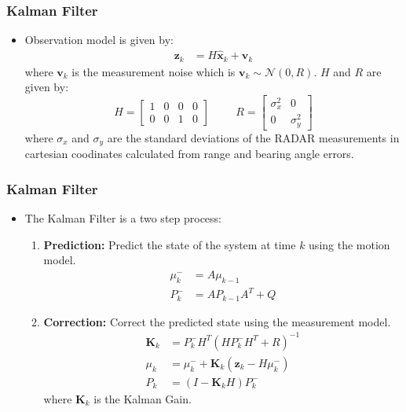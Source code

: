 \documentclass{beamer}
\begin{document}
\begin{frame}
\frametitle{Kalman Filter}
\begin{itemize}
    \item Observation model is given by:
    \begin{align*}
        \mathbf{z}_k &= H \hat{\mathbf{x}}_k + \mathbf{v}_k
    \end{align*}
    where $\mathbf{v}_k$ is the measurement noise which is $\mathbf{v}_k \sim \mathcal{N}(0, R)$. $H$ and $R$ are given by:
    \begin{equation*}
        H = \begin{bmatrix}
            1 & 0 & 0 & 0 \\
            0 & 0 & 1 & 0
        \end{bmatrix} \hspace{1cm} 
        R = \begin{bmatrix}
            \sigma^2_x & 0 \\
            0 & \sigma^2_y
        \end{bmatrix}
    \end{equation*}
    where $\sigma_x$ and $\sigma_y$ are the standard deviations of the RADAR measurements in cartesian coodinates calculated from 
    range and bearing angle errors.
\end{itemize}
\end{frame}

\begin{frame}
\frametitle{Kalman Filter}
\begin{itemize}
    \item The Kalman Filter is a two step process:
    \begin{enumerate}
        \item \textbf{Prediction:} Predict the state of the system at time $k$ using the motion model.
        \begin{align*}
            \mu_k^- &= A \mu_{k-1} \\
            P_k^- &= A P_{k-1} A^T + Q
        \end{align*}
        \item \textbf{Correction:} Correct the predicted state using the measurement model.
        \begin{align*}
            \mathbf{K}_k &= P_k^- H^T (H P_k^- H^T + R)^{-1} \\
            \mu_k &= \mu_k^- + \mathbf{K}_k (\mathbf{z}_k - H \mu_k^-) \\
            P_k &= (I - \mathbf{K}_k H) P_k^-
        \end{align*}
        where $\mathbf{K}_k$ is the Kalman Gain.
    \end{enumerate}
\end{itemize}
\end{frame}
\end{document}
